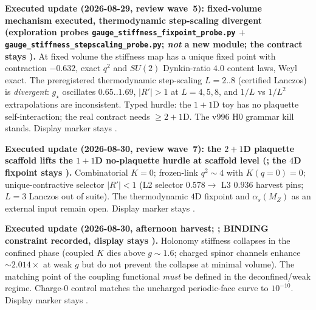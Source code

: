\documentclass[11pt,a4paper]{article}
\begin{document}
\par\smallskip\noindent\textbf{Executed update (2026-08-29, review wave~5): fixed-volume
mechanism executed, thermodynamic step-scaling divergent
(exploration probes \texttt{gauge\_stiffness\_\allowbreak fixpoint\_\allowbreak probe.py} $+$
\texttt{gauge\_stiffness\_\allowbreak stepscaling\_\allowbreak probe.py}; \emph{not} a new module; the contract stays \mO).}
At fixed volume the stiffness map has a unique fixed point with contraction $-0.632$, exact
$q^2$ and $SU(2)$ Dynkin-ratio $4.0$ content laws, Weyl exact.  The preregistered thermodynamic
step-scaling $L=2{..}8$ (certified Lanczos) is \emph{divergent}: $g_\star$ oscillates
$0.65{..}1.69$, $\lvert R'\rvert>1$ at $L=4,5,8$, and $1/L$ vs $1/L^2$ extrapolations are
inconsistent.  Typed hurdle: the $1{+}1$D toy has no plaquette self-interaction; the real
contract needs $\ge 2{+}1$D.  The v996 H0 grammar kill stands.  Display marker stays \mO.

\par\smallskip\noindent\textbf{Executed update (2026-08-30, review wave~7): the $2{+}1$D
plaquette scaffold lifts the $1{+}1$D no-plaquette hurdle at scaffold level
(; the $4$D
fixpoint stays \mO).}
Combinatorial $K=0$; frozen-link $q^2\sim4$ with $K(q=0)=0$; unique-contractive selector
$\lvert R'\rvert<1$ (L2 selector $0.578\to$ L3 $0.936$ harvest pins; $L=3$ Lanczos out of
suite).  The thermodynamic $4$D fixpoint and $\alpha_s(M_Z)$ as an external input remain open.
Display marker stays \mO.

\par\smallskip\noindent\textbf{Executed update (2026-08-30, afternoon harvest;
;
BINDING constraint recorded, display stays \mO).}
Holonomy stiffness collapses in the confined phase (coupled $K$ dies above $g\sim1.6$;
charged spinor channels enhance $\sim2.014{\times}$ at weak $g$ but do not prevent the
collapse at minimal volume).  The matching point of the coupling functional
\emph{must} be defined in the deconfined/weak regime.  Charge-$0$ control matches the
uncharged periodic-face curve to $10^{-10}$.  Display marker stays \mO.

\end{document}

